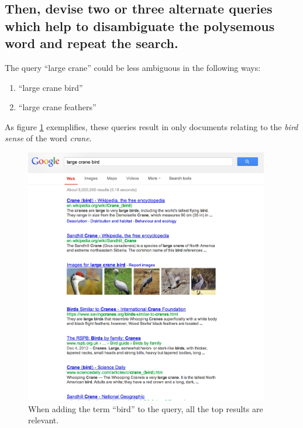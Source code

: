 \documentclass[11pt,a4paper]{article}
\begin{document}

    \subsection{Then, devise two or three alternate queries which help to disambiguate the polysemous word and repeat the search.} %
    \label{sub:then_devise_two_or_three_alternate_queries_which_help_to_disambiguate_the_polysemous_word_and_repeat_the_search_}

      The query ``large crane'' could be less ambiguous in the following ways:

      \begin{enumerate}
        \item ``large crane bird''
        \item ``large crane feathers''
      \end{enumerate}

      As figure \ref{fig:large_crane_bird_google} exemplifies, these queries result in only documents relating to the \emph{bird sense} of the word \emph{crane}.

      \begin{figure}
        \includegraphics[width=0.95\textwidth]{imgs/large_crane_bird_google}
        \caption{When adding the term ``bird'' to the query, all the top results are relevant.}
        \label{fig:large_crane_bird_google}
      \end{figure}
\end{document}
